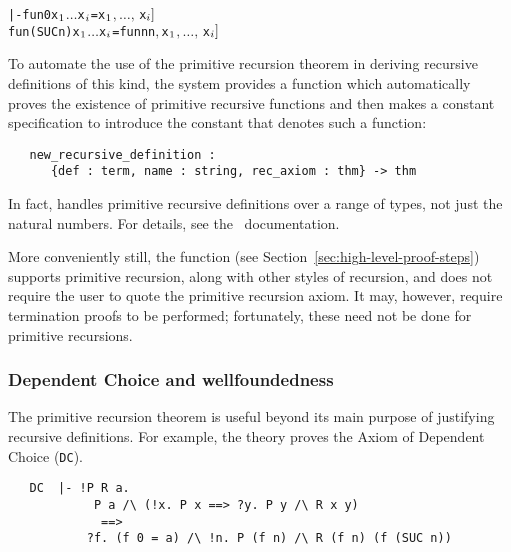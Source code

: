 \begin{hol}
\begin{alltt}
   |- fun 0 x\(\sb{1}\) \(\dots\) x\(\sb{i}\) = \m{f\sb{1}[}x\(\sb{1}\)\(,\ldots,\,\)x\(\sb{i}]\)
      fun (SUC n) x\(\sb{1}\) \(\dots\) x\(\sb{i}\) = \m{f\sb{2}[}fun n  n\(,\) x\(\sb{1}\)\(,\ldots,\,\)x\(\sb{i}]\)
\end{alltt}
\end{hol}

To automate the use of the primitive recursion theorem in deriving
recursive definitions of this kind, the \HOL{} system provides a function
which automatically proves the existence of primitive recursive
functions and then makes a constant specification to introduce the constant
that denotes such a function:

\begin{boxed}
\begin{verbatim}
   new_recursive_definition :
      {def : term, name : string, rec_axiom : thm} -> thm
\end{verbatim}
\end{boxed}

\noindent In fact,  handles
primitive recursive definitions over a range of types, not just the
natural numbers. For details, see the \REFERENCE\ documentation.

More conveniently still, the  function (see
Section~\ref{sec:high-level-proof-steps}) supports primitive
recursion, along with other styles of recursion, and does not require
the user to quote the primitive recursion axiom. It may, however,
require termination proofs to be performed; fortunately, these need
not be done for primitive recursions.

\subsubsection{Dependent Choice and wellfoundedness}
\label{prim-rec-conseq}

The primitive recursion theorem is useful beyond its main purpose of
justifying recursive definitions. For example, the theory
 proves the Axiom of Dependent Choice ({\small\verb+DC+}).

\begin{hol}
{\small
\begin{verbatim}
   DC  |- !P R a.
            P a /\ (!x. P x ==> ?y. P y /\ R x y)
             ==>
           ?f. (f 0 = a) /\ !n. P (f n) /\ R (f n) (f (SUC n))
\end{verbatim}
}
\end{hol}

